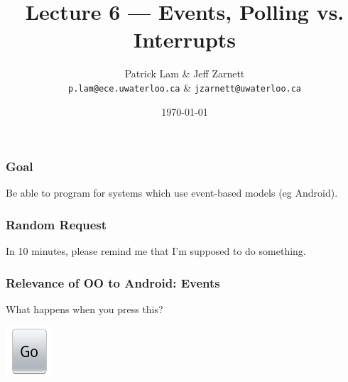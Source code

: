 

\usepackage{alltt}

\title{Lecture 6 --- Events, Polling vs. Interrupts}

\author{Patrick Lam \& Jeff Zarnett \\ \small \texttt{p.lam@ece.uwaterloo.ca} \& \texttt{jzarnett@uwaterloo.ca}}
\date{\today}





\begin{frame}
  \titlepage

\end{frame}

\begin{frame}
\frametitle{Goal}

\Large

\begin{changemargin}{1cm}
Be able to program for systems which use event-based models (eg Android).
\end{changemargin}

\end{frame}


\begin{frame}
\frametitle{Random Request}

\begin{changemargin}{1cm}
In 10 minutes, please remind me that I'm supposed to do something.
\end{changemargin}

\end{frame}

\begin{frame}
\frametitle{Relevance of OO to Android: Events}

\begin{changemargin}{1cm}
What happens when you press this?

\begin{center}
\includegraphics{images/go-button}
\end{center}
\large {}
\end{changemargin}

\end{frame}


